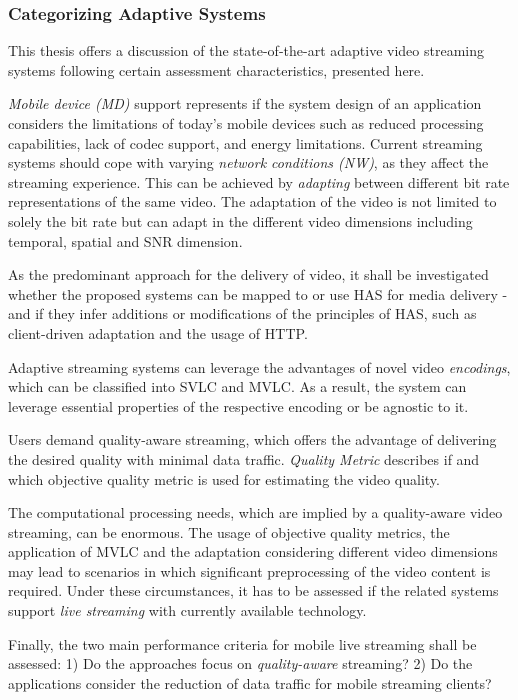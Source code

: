 \subsubsection{Categorizing Adaptive Systems}
This thesis offers a discussion of the state-of-the-art adaptive video streaming systems following certain assessment characteristics, presented here.

\emph{Mobile device (MD)} support represents if the system design of an application considers the limitations of today's mobile devices such as reduced processing capabilities, lack of codec support, and energy limitations.
Current streaming systems should cope with varying \emph{network conditions (NW)}, as they affect the streaming experience. 
This can be achieved by \emph{adapting} between different bit rate representations of the same video.
The adaptation of the video is not limited to solely the bit rate but can adapt in the different video dimensions including temporal, spatial and \ac{SNR} dimension.

As the predominant approach for the delivery of video, it shall be investigated whether the proposed systems can be mapped to or use \ac{HAS} for media delivery - and if they infer additions or modifications of the principles of \ac{HAS}, such as client-driven adaptation and the usage of \ac{HTTP}.

Adaptive streaming systems can leverage the advantages of novel video \emph{encodings}, which can be classified into \ac{SVLC} and \ac{MVLC}.
As a result, the system can leverage essential properties of the respective encoding or be agnostic to it.

Users demand quality-aware streaming, which offers the advantage of delivering the desired quality with minimal data traffic. 
\emph{Quality Metric} describes if and which objective quality metric is used for estimating the video quality.

The computational processing needs, which are implied by a quality-aware video streaming, can be enormous. 
The usage of objective quality metrics, the application of \ac{MVLC} and the adaptation considering different video dimensions may lead to scenarios in which significant preprocessing of the video content is required.
Under these circumstances, it has to be assessed if the related systems support \emph{live streaming} with currently available technology.

Finally, the two main performance criteria for mobile live streaming shall be assessed:
1) Do the approaches focus on \emph{quality-aware} streaming? 2) Do the applications consider the reduction of data traffic for mobile streaming clients? 
